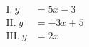 \documentclass[preview]{standalone}
\begin{document}
\begin{align*}
\text{I.}~y &= 5x-3\\ \text{II.}~ y&= -3x+5 \\ \text{III.}~ y &= 2x
\end{align*}
\end{document}
